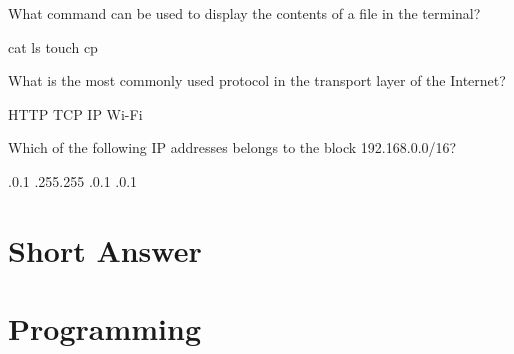 \documentclass[answers,addpoints]{exam}
\begin{document}
\begin{questions}
\question What command can be used to display the contents of a file in the terminal?
\begin{choices}
    \CorrectChoice cat
    \choice ls
    \choice touch
    \choice cp
\end{choices}

\question What is the most commonly used protocol in the transport layer of the Internet?
\begin{choices}
    \choice HTTP
    \CorrectChoice TCP
    \choice IP
    \choice Wi-Fi
\end{choices}

\question Which of the following IP addresses belongs to the block 192.168.0.0/16?
\begin{choices}
    .0.1
    .255.255
    .0.1
    .0.1
\end{choices}

\end{questions}

\section{Short Answer}

\section{Programming}
\end{document}
